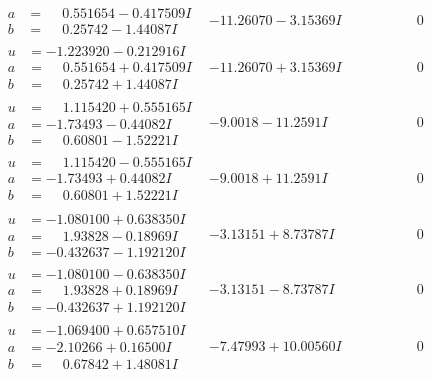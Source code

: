 \documentclass[1p]{elsarticle_modified}
\theoremstyle{definition}
\begin{document}
$$\begin{array}{c|c|c}
\begin{aligned}
a &= \phantom{-}0.551654 - 0.417509 I \\
b &= \phantom{-}0.25742 - 1.44087 I\end{aligned}
 & -11.26070 - 3.15369 I & \phantom{-0.000000 } 0 \\ \hline\begin{aligned}
u &= -1.223920 - 0.212916 I \\
a &= \phantom{-}0.551654 + 0.417509 I \\
b &= \phantom{-}0.25742 + 1.44087 I\end{aligned}
 & -11.26070 + 3.15369 I & \phantom{-0.000000 } 0 \\ \hline\begin{aligned}
u &= \phantom{-}1.115420 + 0.555165 I \\
a &= -1.73493 - 0.44082 I \\
b &= \phantom{-}0.60801 - 1.52221 I\end{aligned}
 & -9.0018 - 11.2591 I & \phantom{-0.000000 } 0 \\ \hline\begin{aligned}
u &= \phantom{-}1.115420 - 0.555165 I \\
a &= -1.73493 + 0.44082 I \\
b &= \phantom{-}0.60801 + 1.52221 I\end{aligned}
 & -9.0018 + 11.2591 I & \phantom{-0.000000 } 0 \\ \hline\begin{aligned}
u &= -1.080100 + 0.638350 I \\
a &= \phantom{-}1.93828 - 0.18969 I \\
b &= -0.432637 - 1.192120 I\end{aligned}
 & -3.13151 + 8.73787 I & \phantom{-0.000000 } 0 \\ \hline\begin{aligned}
u &= -1.080100 - 0.638350 I \\
a &= \phantom{-}1.93828 + 0.18969 I \\
b &= -0.432637 + 1.192120 I\end{aligned}
 & -3.13151 - 8.73787 I & \phantom{-0.000000 } 0 \\ \hline\begin{aligned}
u &= -1.069400 + 0.657510 I \\
a &= -2.10266 + 0.16500 I \\
b &= \phantom{-}0.67842 + 1.48081 I\end{aligned}
 & -7.47993 + 10.00560 I & \phantom{-0.000000 } 0 \\ \hline\begin{aligned}

\end{aligned}
\end{array}$$
\end{document}
